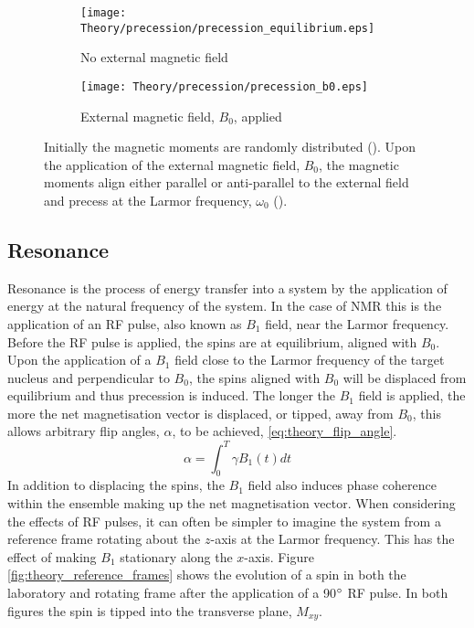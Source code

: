 \begin{figure}[H]
	\centering
	\begin{subfigure}[c]{0.47\textwidth}
		\centering
		\texttt{[image: Theory/precession/precession\_equilibrium.eps]}
		\caption{No external magnetic field}
		\label{fig:theory_precession_eq}
	\end{subfigure}
	\hfill
	\begin{subfigure}[c]{0.47\textwidth}
		\centering
		\texttt{[image: Theory/precession/precession\_b0.eps]}
		\caption{External magnetic field, $B_0$, applied}
		\label{fig:theory_precession_b0}
	\end{subfigure}
	\caption{Initially the magnetic moments are randomly distributed (). Upon the application of the external magnetic field, $B_0$, the magnetic moments align either parallel or anti-parallel to the external field and precess at the Larmor frequency, $\omega_0$ ().}
	\label{fig:theory_precession}
\end{figure}

\subsection{Resonance}

Resonance is the process of energy transfer into a system by the application of energy at the natural frequency of the system. In the case of \ac{NMR} this is the application of an \ac{RF} pulse, also known as $B_1$ field, near the Larmor frequency. Before the \ac{RF} pulse is applied, the spins are at equilibrium, aligned with $B_0$. Upon the application of a $B_1$ field close to the Larmor frequency of the target nucleus and perpendicular to $B_0$, the spins aligned with $B_0$ will be displaced from equilibrium and thus precession is induced. The longer the $B_1$ field is applied, the more the net magnetisation vector is displaced, or tipped, away from $B_0$, this allows arbitrary flip angles, $\alpha$, to be achieved, \eqref{eq:theory_flip_angle}. 
\begin{equation}
\alpha = \int_{0}^{T} \gamma B_1\left(t\right) dt
\label{eq:theory_flip_angle}
\end{equation}
In addition to displacing the spins, the $B_1$ field also induces phase coherence within the ensemble making up the net magnetisation vector. When considering the effects of \ac{RF} pulses, it can often be simpler to imagine the system from a reference frame rotating about the $z$-axis at the Larmor frequency. This has the effect of making $B_1$ stationary along the $x$-axis. Figure \ref{fig:theory_reference_frames} shows the evolution of a spin in both the laboratory and rotating frame after the application of a 90$\degree$  \ac{RF} pulse. In both figures the spin is tipped into the transverse plane, $M_{xy}$.

